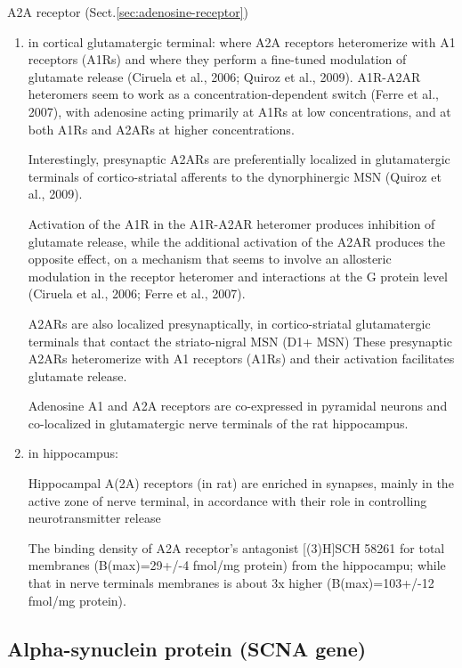 A2A receptor (Sect.\ref{sec:adenosine-receptor})
\begin{enumerate}
  \item in cortical glutamatergic terminal: 
  where A2A receptors heteromerize with A1 receptors (A1Rs) and where they
  perform a fine-tuned modulation of glutamate release (Ciruela et al., 2006;
  Quiroz et al., 2009).
  A1R-A2AR heteromers seem to work as a concentration-dependent switch (Ferre
  et al., 2007), with adenosine acting primarily at A1Rs at low concentrations,
  and at both A1Rs and A2ARs at higher concentrations. 
  
Interestingly, presynaptic A2ARs are preferentially localized in glutamatergic
terminals of cortico-striatal afferents to the dynorphinergic MSN (Quiroz et
al., 2009). 
  
Activation of the A1R in the A1R-A2AR heteromer produces inhibition of glutamate
release, while the additional activation of the A2AR produces the opposite
effect, on a mechanism that seems to involve an allosteric modulation in the
receptor heteromer and interactions at the G protein level (Ciruela et al.,
2006; Ferre et al., 2007).     

 A2ARs are also localized presynaptically, in cortico-striatal glutamatergic
 terminals that contact the striato-nigral MSN (D1+ MSN) These presynaptic A2ARs
 heteromerize with A1 receptors (A1Rs) and their activation facilitates
 glutamate release. \citep{ferre2011}
  
  Adenosine A1 and A2A receptors are co-expressed in pyramidal neurons and
  co-localized in glutamatergic nerve terminals of the rat hippocampus. 
  
  
    \item in hippocampus:

 Hippocampal A(2A) receptors (in rat) are enriched in synapses, mainly in the
 active zone of nerve terminal, in accordance with their role in controlling
 neurotransmitter release \citep{rebola2005}
    
  The binding density of A2A receptor's antagonist [(3)H]SCH 58261 for total
  membranes (B(max)=29+/-4 fmol/mg protein) from the hippocampu; while that in 
  nerve terminals membranes is about 3x higher (B(max)=103+/-12 fmol/mg
  protein).
  
  
\end{enumerate}

\subsection{Alpha-synuclein protein (SCNA gene)}
\label{sec:alpha-synuclein}
\label{sec:SNCA-gene}

